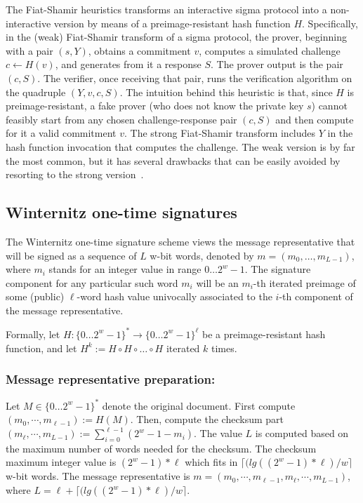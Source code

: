 \documentclass[11pt]{llncs}
\begin{document}
The Fiat-Shamir heuristics transforms an interactive sigma protocol into a non-interactive version by means of a preimage-resistant hash function $H$. Specifically, in the (weak) Fiat-Shamir transform of a sigma protocol, the prover, beginning with a pair $(s, Y)$, obtains a commitment $v$, computes a simulated challenge $c \gets H(v)$, and generates from it a response $S$. The prover output is the pair $(c, S)$. The verifier, once receiving that pair, runs the verification algorithm on the quadruple $(Y, v, c, S)$. The intuition behind this heuristic is that, since $H$ is preimage-resistant, a fake prover (who does not know the private key $s$) cannot feasibly start from any chosen challenge-response pair $(c, S)$ and then compute for it a valid commitment $v$. The strong Fiat-Shamir transform includes $Y$ in the hash function invocation that computes the challenge. The weak version is by far the most common, but it has several drawbacks that can be easily avoided by resorting to the strong version~\cite{bernhard-pereira-warinschi}.

\subsection{Winternitz one-time signatures}

The Winternitz one-time signature scheme views the message representative that will be signed as a sequence of $L$ w-bit words, denoted by $m = (m_0, \dots, m_{L-1})$, where $m_i$ stands for an integer value in range $0 \dots 2^w-1$. The signature component for any particular such word $m_i$ will be an $m_i$-th iterated preimage of some (public) $\ell$-word hash value univocally associated to the $i$-th component of the message representative.

Formally, let $H: \{0 \dots 2^w-1\}^* \rightarrow \{0 \dots 2^w-1\}^\ell$ be a preimage-resistant hash function, and let $H^k := H \circ H \circ \dots \circ H$ iterated $k$ times. 

\subsubsection{Message representative preparation:}

Let $M \in \{0 \dots 2^w-1\}^* $ denote the original document. First compute $(m_0, \cdots, m_{\ell-1}) := H(M)$. Then, compute the checksum part $(m_{\ell}, \cdots, m_{L-1}) := \sum_{i=0}^{\ell-1}{(2^w - 1 - m_i)}$. The value $L$ is computed based on the maximum number of words needed for the checksum. The checksum maximum integer value is $(2^w-1)*\ell$ which fits in $\lceil (lg((2^w-1)*\ell) / w \rceil$ w-bit words. The message representative is $m = (m_0, \cdots, m_{\ell-1}, m_{\ell}, \cdots, m_{L-1})$, where $L = \ell + \lceil (lg((2^w-1)*\ell) / w \rceil$.
\end{document}
